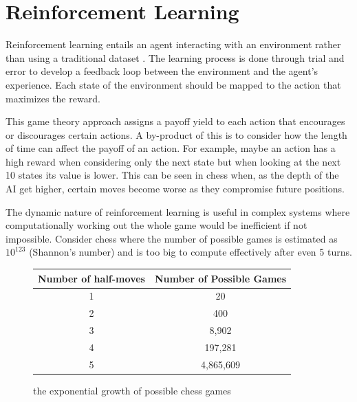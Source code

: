 \documentclass[10pt,a4paper]{report}
\begin{document}
	\chapter{Reinforcement Learning}
		Reinforcement learning entails an agent interacting with an environment rather than using a traditional dataset \autocite[p. 105]{DeepLearning}.
		The learning process is done through trial and error to develop a feedback loop between the environment and the agent's experience. Each state of the environment should be mapped to the action that maximizes the reward. \par
		This game theory approach assigns a payoff yield to each action that encourages or discourages certain actions.
		A by-product of this is to consider how the length of time can affect the payoff of an action. For example, maybe an action has
		a high reward when considering only the next state but when looking at the next 10 states its value is lower. This can be seen
		in chess when, as the depth of the AI get higher, certain moves become worse as they compromise future positions. \par
		The dynamic nature of reinforcement learning is useful in complex systems where computationally working out the whole game would be inefficient if not impossible.
		Consider chess \autocite{shannon1950xxii} where the number of possible games is estimated as $10^{123}$ (Shannon's number) and is too big to compute effectively after even 5 turns.
		\begin{figure}[h]
			\centering
			\begin{tabular}{||c c||}
				\hline
				Number of half-moves & Number of Possible Games\\ [0.5ex]
				\hline\hline
				1 & 20\\
				\hline
				2 & 400\\
				\hline
				3 & 8,902\\
				\hline
				4 & 197,281\\
				\hline
				5 & 4,865,609\\[1ex]
				\hline
			\end{tabular}
			\caption{the exponential growth of possible chess games}
			\label{fig:possible-chess-games}
		\end{figure}
\end{document}
